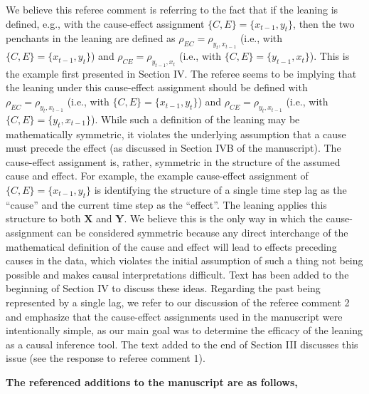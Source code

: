 \documentclass[a4paper,11pt]{article}
\begin{document}
We believe this referee comment is referring to the fact that if the leaning is defined, e.g., with the cause-effect assignment $\{C,E\}=\{x_{t-1},y_{t}\}$, then the two penchants in the leaning are defined as $\rho_{EC} = \rho_{y_t,x_{t-1}}$ (i.e., with $\{C,E\}=\{x_{t-1},y_{t}\}$) and $\rho_{CE} = \rho_{y_{t-1},x_t}$ (i.e., with $\{C,E\}=\{y_{t-1},x_{t}\}$).  This is the example first presented in Section IV.  The referee seems to be implying that the leaning under this cause-effect assignment should be defined with $\rho_{EC} = \rho_{y_t,x_{t-1}}$ (i.e., with $\{C,E\}=\{x_{t-1},y_{t}\}$) and $\rho_{CE} = \rho_{y_t,x_{t-1}}$ (i.e., with $\{C,E\}=\{y_{t},x_{t-1}\}$).  While such a definition of the leaning may be mathematically symmetric, it violates the underlying assumption that a cause must precede the effect (as discussed in Section IVB of the manuscript).  The cause-effect assignment is, rather, symmetric in the structure of the assumed cause and effect.  For example, the example cause-effect assignment of $\{C,E\}=\{x_{t-1},y_{t}\}$ is identifying the structure of a single time step lag as the ``cause'' and the current time step as the ``effect''.  The leaning applies this structure to both $\mathbf{X}$ and $\mathbf{Y}$.  We believe this is the only way in which the cause-assignment can be considered symmetric because any direct interchange of the mathematical definition of the cause and effect will lead to effects preceding causes in the data, which violates the initial assumption of such a thing not being possible and makes causal interpretations difficult.  Text has been added to the beginning of Section IV to discuss these ideas.  Regarding the past being represented by a single lag, we refer to our discussion of the referee comment 2 and emphasize that the cause-effect assignments used in the manuscript were intentionally simple, as our main goal was to determine the efficacy of the leaning as a causal inference tool.  The text added to the end of Section III discusses this issue (see the response to referee comment 1).

{\bf The referenced additions to the manuscript are as follows,}
\end{document}

